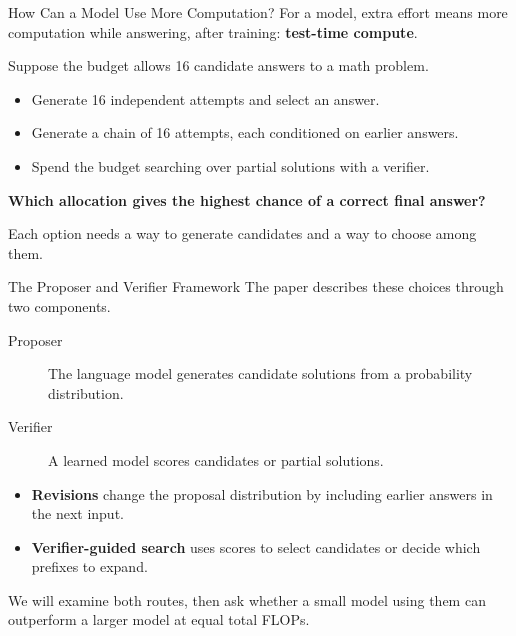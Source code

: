 \documentclass[aspectratio=1610,xcolor=dvipsnames,t]{beamer}
\newcommand{\keyterm}[1]{\textcolor{unirot}{\textbf{#1}}}
\begin{document}
\begin{frame}{How Can a Model Use More Computation?}
  For a model, extra effort means more computation while answering, after training: \textbf{test-time compute}.
  \par\smallskip
  Suppose the budget allows 16 candidate answers to a math problem.
  \par\medskip
  \begin{itemize}
    \item Generate 16 independent attempts and select an answer.
    \item Generate a chain of 16 attempts, each conditioned on earlier answers.
    \item Spend the budget searching over partial solutions with a verifier.
  \end{itemize}
  \par\medskip
  \keyterm{Which allocation gives the highest chance of a correct final answer?}
  \par\medskip
  Each option needs a way to generate candidates and a way to choose among them.
\end{frame}

\begin{frame}{The Proposer and Verifier Framework}
  The paper describes these choices through two components.
  \par\smallskip
  \begin{description}
    \item[Proposer] The language model generates candidate solutions from a probability distribution.
    \item[Verifier] A learned model scores candidates or partial solutions.
  \end{description}
  \par\medskip
  \begin{itemize}
    \item \keyterm{Revisions} change the proposal distribution by including earlier answers in the next input.
    \item \keyterm{Verifier-guided search} uses scores to select candidates or decide which prefixes to expand.
  \end{itemize}
  \par\medskip
  We will examine both routes, then ask whether a small model using them can outperform a larger model at equal total FLOPs.
\end{frame}
\end{document}
